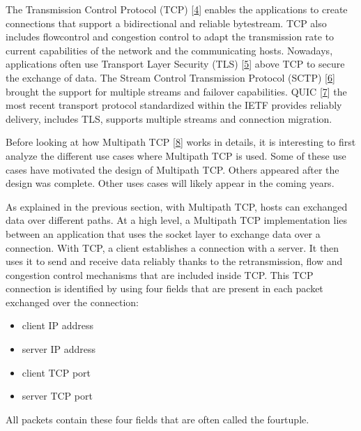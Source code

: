 \documentclass[letterpaper,10pt,english]{sphinxmanual}
\begin{document}
The Transmission Control Protocol (TCP) {[}\hyperlink{cite.biblio:id729}{4}{]} enables the applications to create connections that support a bidirectional and reliable bytestream. TCP also includes flow\sphinxhyphen{}control and congestion control to adapt the transmission rate to current capabilities of the network and the communicating hosts. Nowadays, applications often use Transport Layer Security (TLS) {[}\hyperlink{cite.biblio:id8271}{5}{]} above TCP to secure the exchange of data. The Stream Control Transmission Protocol (SCTP) {[}\hyperlink{cite.biblio:id4847}{6}{]} brought the support for multiple streams and failover capabilities. QUIC {[}\hyperlink{cite.biblio:id8812}{7}{]} the most recent transport protocol standardized within the IETF provides reliably delivery, includes TLS, supports multiple streams and connection migration.

\sphinxAtStartPar
Before looking at how Multipath TCP {[}\hyperlink{cite.biblio:id6658}{8}{]} works in details, it is interesting to first analyze the different use cases where Multipath TCP is used. Some of these use cases have motivated the design of Multipath TCP. Others appeared after the design was complete. Other uses cases will likely appear in the coming years.

\sphinxAtStartPar
As explained in the previous section, with Multipath TCP, hosts can exchanged data over different paths. At a high level, a Multipath TCP implementation lies between an application that uses the socket layer to exchange data over a connection. With TCP, a client establishes a connection with a server. It then uses it to send and receive data reliably thanks to the retransmission, flow and congestion control mechanisms that are included inside TCP. This TCP connection is identified by using four fields that are present in each packet exchanged over the connection:
\begin{itemize}
\item {} 
\sphinxAtStartPar
client IP address

\item {} 
\sphinxAtStartPar
server IP address

\item {} 
\sphinxAtStartPar
client TCP port

\item {} 
\sphinxAtStartPar
server TCP port

\end{itemize}

\sphinxAtStartPar
All packets contain these four fields that are often called the four\sphinxhyphen{}tuple.
\end{document}
